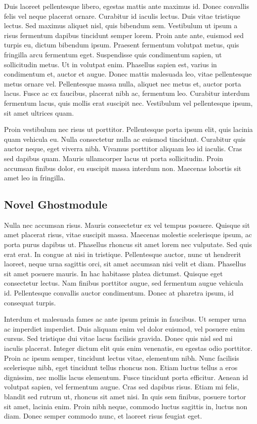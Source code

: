 Duis laoreet pellentesque libero, egestas mattis ante maximus id. Donec convallis felis vel neque placerat ornare. Curabitur id iaculis lectus. Duis vitae tristique lectus. Sed maximus aliquet nisl, quis bibendum sem. Vestibulum ut ipsum a risus fermentum dapibus tincidunt semper lorem. Proin ante ante, euismod sed turpis eu, dictum bibendum ipsum. Praesent fermentum volutpat metus, quis fringilla arcu fermentum eget. Suspendisse quis condimentum sapien, ut sollicitudin metus. Ut in volutpat enim. Phasellus sapien est, varius in condimentum et, auctor et augue. Donec mattis malesuada leo, vitae pellentesque metus ornare vel. Pellentesque massa nulla, aliquet nec metus et, auctor porta lacus. Fusce ac ex faucibus, placerat nibh ac, fermentum leo. Curabitur interdum fermentum lacus, quis mollis erat suscipit nec. Vestibulum vel pellentesque ipsum, sit amet ultrices quam.

Proin vestibulum nec risus ut porttitor. Pellentesque porta ipsum elit, quis lacinia quam vehicula eu. Nulla consectetur nulla ac euismod tincidunt. Curabitur quis auctor neque, eget viverra nibh. Vivamus porttitor aliquam leo id iaculis. Cras sed dapibus quam. Mauris ullamcorper lacus ut porta sollicitudin. Proin accumsan finibus dolor, eu suscipit massa interdum non. Maecenas lobortis sit amet leo in fringilla.

\subsection{Novel Ghostmodule} %
\label{sub:amet}
Nulla nec accumsan risus. Mauris consectetur ex vel tempus posuere. Quisque sit amet placerat risus, vitae suscipit massa. Maecenas molestie scelerisque ipsum, ac porta purus dapibus ut. Phasellus rhoncus sit amet lorem nec vulputate. Sed quis erat erat. In congue at nisi in tristique. Pellentesque auctor, nunc ut hendrerit laoreet, neque urna sagittis orci, sit amet accumsan nisi velit et diam. Phasellus sit amet posuere mauris. In hac habitasse platea dictumst. Quisque eget consectetur lectus. Nam finibus porttitor augue, sed fermentum augue vehicula id. Pellentesque convallis auctor condimentum. Donec at pharetra ipsum, id consequat turpis.

Interdum et malesuada fames ac ante ipsum primis in faucibus. Ut semper urna ac imperdiet imperdiet. Duis aliquam enim vel dolor euismod, vel posuere enim cursus. Sed tristique dui vitae lacus facilisis gravida. Donec quis nisl sed mi iaculis placerat. Integer dictum elit quis enim venenatis, eu egestas odio porttitor. Proin ac ipsum semper, tincidunt lectus vitae, elementum nibh. Nunc facilisis scelerisque nibh, eget tincidunt tellus rhoncus non. Etiam luctus tellus a eros dignissim, nec mollis lacus elementum. Fusce tincidunt porta efficitur. Aenean id volutpat sapien, vel fermentum augue. Cras sed dapibus risus. Etiam mi felis, blandit sed rutrum ut, rhoncus sit amet nisi. In quis sem finibus, posuere tortor sit amet, lacinia enim. Proin nibh neque, commodo luctus sagittis in, luctus non diam. Donec semper commodo nunc, et laoreet risus feugiat eget.

